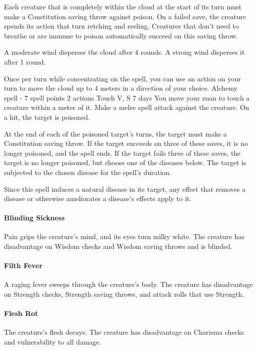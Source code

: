         Each creature that is completely within the cloud at the start of its turn must make a Constitution saving throw against poison.
        On a failed save, the creature spends its action that turn retching and reeling.
        Creatures that don't need to breathe or are immune to poison automatically succeed on this saving throw.

        A moderate wind disperses the cloud after 4 rounds.
        A strong wind disperses it after 1 round.

        Once per turn while concentrating on the spell, you can use an action on your turn to move the cloud up to 4 meters in a direction of your choice.
        {Alchemy spell - 7 spell points}
        {2 actions}
        {Touch}
        {V, S}
        {7 days}
        You move your zuan to touch a creature within a meter of it.
        Make a melee spell attack against the creature.
        On a hit, the target is poisoned.

        At the end of each of the poisoned target's turns, the target must make a Constitution saving throw.
        If the target succeeds on three of these saves, it is no longer poisoned, and the spell ends.
        If the target fails three of these saves, the target is no longer poisoned, but choose one of the diseases below.
        The target is subjected to the chosen disease for the spell's duration.

        Since this spell induces a natural disease in its target, any effect that removes a disease or otherwise ameliorates a disease's effects apply to it.

        \paragraph{Blinding Sickness}
        Pain grips the creature's mind, and its eyes turn milky white.
        The creature has disadvantage on Wisdom checks and Wisdom saving throws and is blinded.
        \paragraph{Filth Fever}
        A raging fever sweeps through the creature's body.
        The creature has disadvantage on Strength checks, Strength saving throws, and attack rolls that use Strength.
        \paragraph{Flesh Rot}
        The creature's flesh decays.
        The creature has disadvantage on Charisma checks and vulnerability to all damage.
